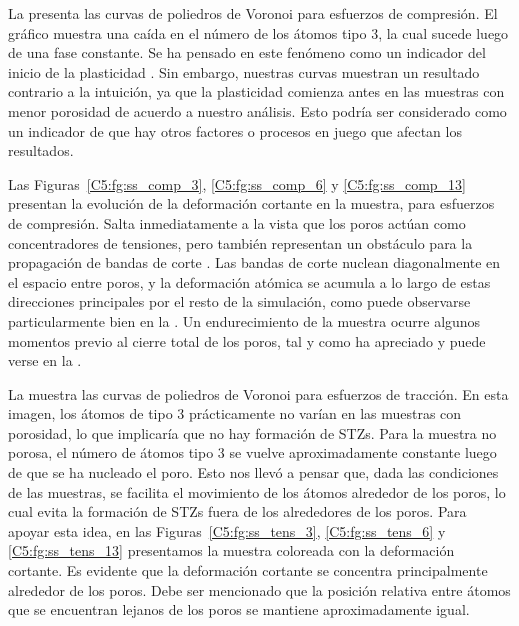 La  presenta las curvas de poliedros de Voronoi para esfuerzos de compresión. El gráfico muestra una caída en el número de los átomos tipo 3, la cual sucede luego de una fase constante. Se ha pensado en este fenómeno como un indicador del inicio de la plasticidad \citep{arman10}. Sin embargo, nuestras curvas muestran un resultado contrario a la intuición, ya que la plasticidad comienza antes en las muestras con menor porosidad de acuerdo a nuestro análisis. Esto podría ser considerado como un indicador de que hay otros factores o procesos en juego que afectan los resultados.

Las Figuras~\ref{C5:fg:ss_comp_3}, \ref{C5:fg:ss_comp_6} y \ref{C5:fg:ss_comp_13} presentan la evolución de la deformación cortante en la muestra, para esfuerzos de compresión. Salta inmediatamente a la vista que los poros actúan como concentradores de tensiones, pero también representan un obstáculo para la propagación de bandas de corte \citep{wang10}. Las bandas de corte nuclean diagonalmente en el espacio entre poros, y la deformación atómica se acumula a lo largo de estas direcciones principales por el resto de la simulación, como puede observarse particularmente bien en la . Un endurecimiento de la muestra ocurre algunos momentos previo al cierre total de los poros, tal y como ha apreciado \cite{yuan14} y puede verse en la .

La  muestra las curvas de poliedros de Voronoi para esfuerzos de tracción. En esta imagen, los átomos de tipo 3
prácticamente no varían en las muestras con porosidad, lo que implicaría que no hay formación de STZs. Para la muestra no porosa, el número de átomos tipo 3 se vuelve aproximadamente constante luego de que se ha nucleado el poro. Esto nos llevó a pensar que, dada las condiciones de las muestras, se facilita el movimiento de los átomos alrededor de los poros, lo cual evita la formación de STZs fuera de los alrededores de los poros. Para apoyar esta idea, en las Figuras~\ref{C5:fg:ss_tens_3}, \ref{C5:fg:ss_tens_6} y \ref{C5:fg:ss_tens_13} presentamos la muestra coloreada con la deformación cortante. Es evidente que la deformación cortante se concentra principalmente alrededor de los poros. Debe ser mencionado que la posición relativa entre átomos que se encuentran lejanos de los poros se mantiene aproximadamente igual.

